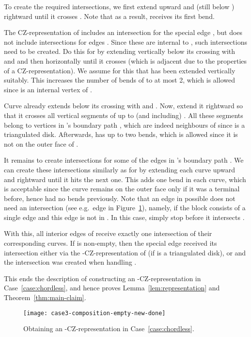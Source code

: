 \documentclass{article}
\renewcommand{\int}[1]{}
\begin{document}
To create the required intersections, we first
extend  upward and (still below ) rightward until it crosses .
Note that as a result,  receives its first bend.

The CZ-representation of  includes an intersection for the special
edge , but does not include intersections for edges 
.
Since these are internal to , such intersections need to be created. Do this for 
by extending  vertically below its crossing with  and  and then horizontally
until it crosses  (which is adjacent due to the properties of a CZ-representation).
We assume for this that  has been extended vertically suitably. 
This increases the number of bends of  to at most 2, which is allowed
since  is an internal vertex of .

Curve  already extends below its crossing with  and
. Now, extend
it rightward so that it crosses all vertical segments of up to (and including) .
All these segments belong to vertices in 's boundary path ,
which are indeed neighbours  of  since  is a triangulated disk.
Afterwards,  has up to two bends, which is allowed since
it is not on the outer face of .

It remains to create intersections for some of the edges in 's boundary
path .
We can create these intersections similarly as for 
by extending each curve upward and rightward until it hits the next one.
This adds one bend in each curve, which is acceptable since the curve 
remains on the outer face only if it was a terminal before, hence had no bends 
previously.   Note that an edge in 
possible does not need an intersection (see e.g.~edge  in 
Figure~\ref{fig:case3-complete}), namely, if the  block consists of
a single edge  and this edge is not in .  In this case,
simply stop  before it intersects .

With this, all interior edges of  receive exactly one intersection of
their corresponding curves.  If  is non-empty, then the special edge
 received its intersection either via the \int{F_1}-CZ-representation
of  (if  is a triangulated disk), or  and 
the intersection was created when handling .
 
This ends the description of constructing an 
\int{F}-CZ-representation in Case~\ref{case:chordless},
and hence proves Lemma~\ref{lem:representation} and
Theorem~\ref{thm:main-claim}.
    
    

\begin{figure}
	\centering
	\texttt{[image: case3-composition-empty-new-done]}
	\caption{Obtaining an \int{F}-CZ-representation in Case~\ref{case:chordless}.}
	\label{fig:case3-complete}
\end{figure}
\end{document}
